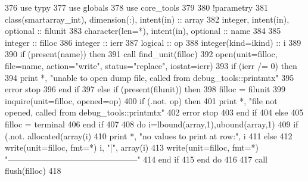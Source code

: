 \begin{DoxyCode}
376       \textcolor{keywordtype}{use }typy
377       \textcolor{keywordtype}{use }globals
378       \textcolor{keywordtype}{use }core_tools
379       
380       \textcolor{comment}{!parametry}
381       \textcolor{keywordtype}{class}(smartarray_int), \textcolor{keywordtype}{dimension(:)}, \textcolor{keywordtype}{intent(in)} :: array
382       \textcolor{keywordtype}{integer}, \textcolor{keywordtype}{intent(in)}, \textcolor{keywordtype}{optional} :: filunit   
383       \textcolor{keywordtype}{character(len=*)}, \textcolor{keywordtype}{intent(in)}, \textcolor{keywordtype}{optional} :: name
384 
385       \textcolor{keywordtype}{integer} :: filloc
386       \textcolor{keywordtype}{integer} :: ierr
387       \textcolor{keywordtype}{logical} :: op
388       \textcolor{keywordtype}{integer(kind=ikind)} :: i
389       
390       \textcolor{keywordflow}{if} (\textcolor{keyword}{present}(name)) \textcolor{keywordflow}{then}
391         \textcolor{keyword}{call }find_unit(filloc)
392         \textcolor{keyword}{open}(unit=filloc, file=name, action=\textcolor{stringliteral}{"write"}, status=\textcolor{stringliteral}{"replace"}, iostat\textcolor{comment}{=ierr)}
393 \textcolor{comment}{        }\textcolor{keywordflow}{if} (ierr /= 0) \textcolor{keywordflow}{then}
394           print *, \textcolor{stringliteral}{"unable to open dump file, called from debug\_tools::printmtx"}
395           error stop
396 \textcolor{keywordflow}{        end if}
397       \textcolor{keywordflow}{else} \textcolor{keywordflow}{if} (\textcolor{keyword}{present}(filunit)) \textcolor{keywordflow}{then}
398         filloc = filunit
399         \textcolor{keyword}{inquire}(unit=filloc, opened=op)
400         \textcolor{keywordflow}{if} (.not. op) \textcolor{keywordflow}{then}
401           print *, \textcolor{stringliteral}{"file not opened, called from debug\_tools::printmtx"}
402           error stop
403 \textcolor{keywordflow}{        end if}
404       \textcolor{keywordflow}{else}
405         filloc = terminal
406 \textcolor{keywordflow}{      end if}
407             
408       \textcolor{keywordflow}{do} i=lbound(array,1),ubound(array,1)
409         \textcolor{keywordflow}{if} (.not. \textcolor{keyword}{allocated}(array(i)%
410           print *, \textcolor{stringliteral}{"no values to print at row:"}, i
411         \textcolor{keywordflow}{else}
412           \textcolor{keyword}{write}(unit=filloc, fmt=*) i, \textcolor{stringliteral}{"|"}, array(i)%
413           \textcolor{keyword}{write}(unit=filloc, fmt=*) \textcolor{stringliteral}{"-----------------------------------------------"}
414 \textcolor{keywordflow}{        end if}
415 \textcolor{keywordflow}{      end do}
416       
417       \textcolor{keyword}{call }flush(filloc)
418       
\end{DoxyCode}


